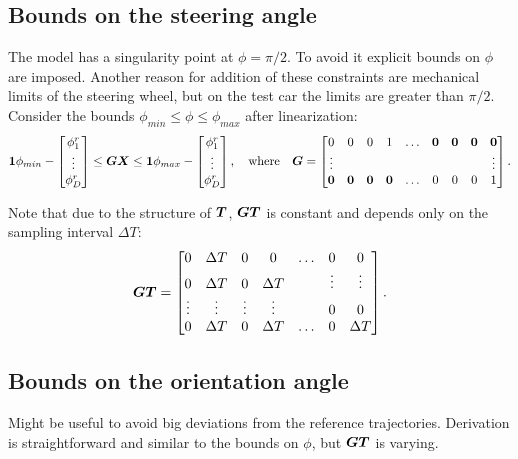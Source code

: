 \documentclass[12pt,a4paper]{article}
\newcommand{\mbm}[1]{\mbox{\boldmath $#1$}}
\begin{document}
\subsection{Bounds on the steering angle}
The model has a singularity point at $\phi = \pi/2$. To avoid it explicit bounds on $\phi$
are imposed. Another reason for addition of these constraints are mechanical limits of the
steering wheel, but on the test car the limits are greater than $\pi/2$. Consider the
bounds $\phi_{min} \le \phi \le \phi_{max}$ after linearization:
\begin{equation}
\mbm{1}\phi_{min} - \begin{bmatrix} \phi^r_1\\ \vdots \\ \phi^r_{D} \end{bmatrix}
\le
\mbm{G} \mbm{X} 
\le 
\mbm{1}\phi_{max} - \begin{bmatrix} \phi^r_1\\ \vdots \\ \phi^r_{D} \end{bmatrix},
\quad
\mbox{where}
\quad
\mbm{G} = 
\begin{bmatrix}
    0       & 0 & 0 & 1 &  \dots    & \mbm{0}  & \mbm{0}  & \mbm{0}  & \mbm{0} \\
    \vdots  &   &   &   &           &   &   &   & \vdots \\
    \mbm{0} & \mbm{0}  & \mbm{0}  & \mbm{0}  &  \dots    & 0 & 0 & 0 & 1\\
\end{bmatrix}.
\end{equation}

Note that due to the structure of $\mbm{T}$, $\mbm{G}\mbm{T}$ is constant and depends only on
the sampling interval $\Delta T$:
\begin{equation}
\mbm{G}\mbm{T} = 
\begin{bmatrix}
    0       & \Delta T & 0      & 0         & \dots & 0         & 0 \\
    0       & \Delta T & 0      & \Delta T  &       & \vdots    & \vdots \\
    \vdots  & \vdots   & \vdots & \vdots    &       & 0         & 0 \\
    0       & \Delta T & 0      & \Delta T  & \dots & 0         & \Delta T\\
\end{bmatrix}.
\end{equation}


\subsection{Bounds on the orientation angle}
Might be useful to avoid big deviations from the reference trajectories. Derivation is 
straightforward and similar to the bounds on $\phi$, but $\mbm{G}\mbm{T}$ is varying.
\end{document}
